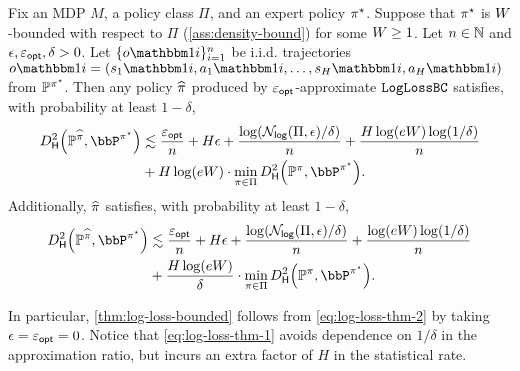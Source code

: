 \begin{theorem}\label{thm:log-loss-bounded-app}
Fix an MDP $M$, a policy class $\Pi$, and an expert policy $\pi^{\star}$. Suppose that $\pi^{\star}$ is $W$-bounded with respect to $\Pi$ (\cref{ass:density-bound}) for some $W \geq 1$. Let $n \in \mathbb{N}$ and $\epsilon,\varepsilon_{\mathsf{opt}},\delta > 0$. Let $\{o\ind{i}\}_{i=1}^n$ be i.i.d. trajectories $o\ind{i} = (s_1\ind{i},a_1\ind{i},\dots,s_H\ind{i},a_H\ind{i})$ from $\mathbb{P}^{\pi^{\star}}$. Then any policy $\widehat{\pi}$ produced by $\varepsilon_{\mathsf{opt}}$-approximate $\texttt{LogLossBC}$ satisfies, with probability at least $1-\delta$,
\begin{align} \Dhels{\BP^{\pihat}}{\bbP^{\pistar}} &\lesssim \frac{\epopt}{n} + H\epsilon+\frac{\log(\Nlog(\Pi,\epsilon)/\delta)}{n} + \frac{H\log(eW)\log(1/\delta)}{n} \\
&+ H\log(eW) \cdot \min_{\pi \in \Pi} \Dhels{\BP^\pi}{\bbP^{\pistar}}.
\label{eq:log-loss-thm-1}\end{align}
Additionally, $\widehat{\pi}$ satisfies, with probability at least $1-\delta$,
\begin{align} \Dhels{\BP^{\pihat}}{\bbP^{\pistar}} &\lesssim \frac{\epopt}{n} + H\epsilon+\frac{\log(\Nlog(\Pi,\epsilon)/\delta)}{n} + \frac{\log(eW)\log(1/\delta)}{n} \\&+ \frac{H\log(eW)}{\delta} \cdot \min_{\pi \in \Pi} \Dhels{\BP^\pi}{\bbP^{\pistar}}.
\label{eq:log-loss-thm-2}\end{align}
\end{theorem}

In particular, \cref{thm:log-loss-bounded} follows from
\cref{eq:log-loss-thm-2} by taking $\epsilon = \varepsilon_{\mathsf{opt}} = 0$. Notice that \cref{eq:log-loss-thm-1} avoids dependence on $1/\delta$ in the approximation ratio, but incurs an extra factor of $H$ in the statistical rate. 

